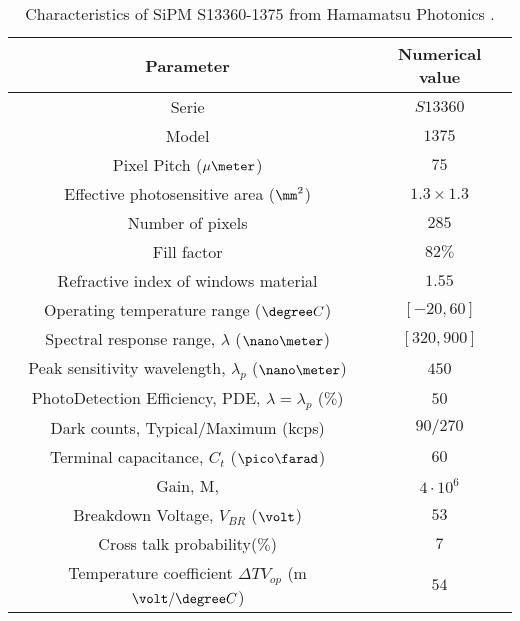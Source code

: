 
\begin{table}[htbp]
\begin{center}
\begin{tabular}{|c|c|}
\hline
Parameter & Numerical value \\
\hline \hline \hline
Serie & $S13360$ \\ \hline
Model & $1375$ \\ \hline
Pixel Pitch ($\mu\meter$) & $75$ \\ \hline
Effective photosensitive area ($\mm^2$) & $1.3 \times 1.3$ \\ \hline
Number of pixels & $285$ \\ \hline
Fill factor & $82\%$ \\ \hline
Refractive index of windows material & $1.55$ \\ \hline
Operating temperature range ($\degree C$)& $[-20,60]$ \\ \hline
Spectral response range, $\lambda$ ($\nano\meter$) & $[320, 900]$ \\ \hline
Peak sensitivity wavelength, $\lambda_p$ ($\nano\meter$) & $450$ \\ \hline
PhotoDetection Efficiency, PDE, $\lambda=\lambda_p$ ($\%$) & $50$ \\ \hline
Dark counts, Typical/Maximum (kcps) & $90/270$ \\ \hline
Terminal capacitance, $C_t$ ($\pico\farad$) & $60$ \\ \hline
Gain, M, & $4 \cdot{} 10^6$ \\ \hline
Breakdown Voltage, $V_{BR}$ ($\volt$) & $53$ \\ \hline
Cross talk probability($\%$) & $7$ \\ \hline
Temperature coefficient $\Delta TV_{op}$ (m$\volt/\degree C$) & $54$ \\ \hline
\end{tabular}
\caption{Characteristics of SiPM S13360-1375 from Hamamatsu Photonics \cite{DataSheetHammamatsu_1_SiPM_1375}.}
\label{tab:PropertiesOfSiPM1375}
\end{center}
\end{table}

